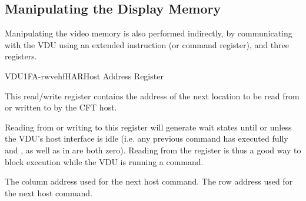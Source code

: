 \subsection{Manipulating the Display Memory}

Manipulating the video memory is also performed indirectly, by communicating
with the VDU using an extended instruction (or command register), and three
registers.

\begin{ioport}{VDU}{1FA}{-rwvehf}{HAR}{Host Address Register}

  This read/write register contains the address of the next location to be read
  from or written to by the CFT host. 

  Reading from or writing to this register will generate wait states until or
  unless the VDU's host interface is idle (i.e. any previous command has
  executed fully and , as well as  in  are both
  zero). Reading from the  register is thus a good way to block
  execution while the VDU is running a command.

  \begin{cbitfield}[8]
     The column address used for the next host command.
     The row address used for the next host command.
  \end{cbitfield}

\end{ioport}



